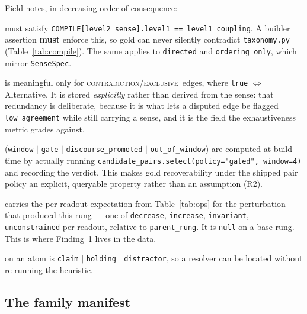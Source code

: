 \documentclass[11pt]{article}
\newcommand{\cCon}{\textsc{contradiction}}
\newcommand{\cExc}{\textsc{exclusive}}
\begin{document}
Field notes, in decreasing order of consequence:

\begin{description}[leftmargin=*,nosep]
  \item[\texttt{level1\_coupling}] must satisfy
        \texttt{COMPILE[level2\_sense].level1 == level1\_coupling}. A builder assertion
        \textbf{must} enforce this, so gold can never silently contradict
        \texttt{taxonomy.py} (Table~\ref{tab:compile}). The same applies to \texttt{directed}
        and \texttt{ordering\_only}, which mirror \texttt{SenseSpec}.
  \item[\texttt{exhaustive}] is meaningful only for \cCon/\cExc\ edges, where
        \texttt{true} $\Leftrightarrow$ Alternative. It is stored \emph{explicitly} rather than
        derived from the sense: that redundancy is deliberate, because it is what lets a
        disputed edge be flagged \texttt{low\_agreement} while still carrying a sense, and it
        is the field the exhaustiveness metric grades against.
  \item[\texttt{in\_candidate\_window} / \texttt{window\_admission}] (\texttt{window} $|$
        \texttt{gate} $|$ \texttt{discourse\_promoted} $|$ \texttt{out\_of\_window}) are
        computed at build time by actually running
        \texttt{candidate\_pairs.select(policy="gated", window=4)} and recording the verdict.
        This makes gold recoverability under the shipped pair policy an explicit, queryable
        property rather than an assumption (R2).
  \item[\texttt{readout\_directions}] carries the per-readout expectation from
        Table~\ref{tab:ops} for the perturbation that produced this rung --- one of
        \texttt{decrease}, \texttt{increase}, \texttt{invariant}, \texttt{unconstrained} per
        readout, relative to \texttt{parent\_rung}. It is \texttt{null} on a base rung. This is
        where Finding~1 lives in the data.
  \item[\texttt{role}] on an atom is \texttt{claim} $|$ \texttt{holding} $|$
        \texttt{distractor}, so a resolver can be located without re-running the heuristic.
\end{description}

\subsection{The family manifest}
\end{document}
